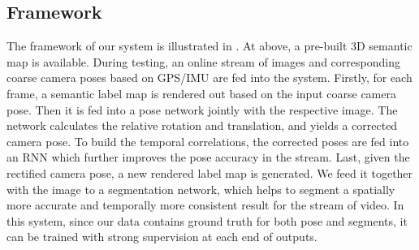 \vspace{-1.0\baselineskip}
\subsection{Framework}
\vspace{-0.6\baselineskip}
\label{sub:framework}
The framework of our system is illustrated in . At above, a pre-built 3D semantic map is available. During testing, an online stream of images and corresponding coarse camera poses based on GPS/IMU are fed into the system. Firstly, for each frame, a semantic label map is rendered out based on the input coarse camera pose. Then it is fed into a pose network jointly with the respective image.  The network calculates the relative rotation and translation, and yields a corrected camera pose. To build the temporal correlations, the corrected poses are fed into an RNN which further improves the pose accuracy in the stream.
Last, given the rectified camera pose, a new rendered label map is generated. We feed it together with the image to a segmentation network, which helps to segment a spatially more accurate and temporally more consistent result for the stream of video.
In this system, since our data contains ground truth for both pose and segments, it can be trained with strong supervision at each end of outputs.

